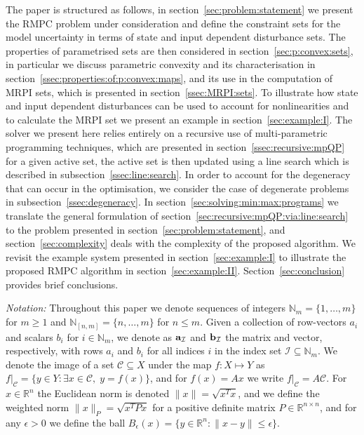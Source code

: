 \documentclass[journal]{IEEEtran}
\theoremstyle{remark}
\theoremstyle{definition}
\begin{document}
The paper is structured as follows, in section~\ref{sec:problem:statement} we present the RMPC problem under consideration
and define the constraint sets for the model uncertainty in terms of state and input dependent disturbance sets.
%
The properties of parametrised sets are then considered in section~\ref{sec:p:convex:sets}, in particular we discuss
parametric convexity and its characterisation in section~\ref{ssec:properties:of:p:convex:maps}, and its use in the computation of MRPI sets, which is presented in section~\ref{ssec:MRPI:sets}.
%
To illustrate how state and input dependent disturbances can be used to account for nonlinearities and 
to calculate the MRPI set we present an example in section~\ref{sec:example:I}.
%
The solver we present here relies entirely on a recursive use of multi-parametric programming techniques, 
which are presented in section~\ref{ssec:recursive:mpQP} for a given active set, the active set is then
updated using a line search which is described in subsection~\ref{ssec:line:search}. In order to account for the 
degeneracy that can occur in the optimisation, we consider the case of degenerate problems in subsection~\ref{ssec:degeneracy}.
%
In section~\ref{sec:solving:min:max:programs} we translate the general formulation of section~\ref{sec:recursive:mpQP:via:line:search}
to the problem presented in section~\ref{sec:problem:statement}, and section~\ref{sec:complexity}
deals with the complexity of the proposed algorithm.
%
We revisit the example system presented in section~\ref{sec:example:I} to illustrate the proposed RMPC
algorithm in section~\ref{sec:example:II}.
%
Section~\ref{sec:conclusion} provides brief conclusions.

\emph{Notation:} Throughout this paper 
%
we denote sequences of integers $\mathbb N_m = \{1,\ldots,m\}$ for $m\geq 1$ and $\mathbb N_{[n,m]} = \{n,\ldots,m\}$ for $n\leq m$.
%
Given a collection of row-vectors $a_i$ and scalars $b_i$ for $i\in\mathbb N_m$, we denote as ${\bf{a}}_{\mathcal I}$ and ${\bf{b}}_{\mathcal I}$ the matrix and vector, respectively, with rows $a_i$ and $b_i$ for all indices $i$ in the index set $\mathcal I\subseteq \mathbb N_m$.
%
We denote the image of a set $\mathcal C\subseteq X$ under the map $f:X\mapsto Y$ as $f\vert_{\mathcal C} = \{y\in Y:\exists x\in\mathcal C,\;y=f(x)\}$, and for $f(x) = Ax$ we write $f\vert_{\mathcal{C}} = A\mathcal{C}$.
%
For $x\in\mathbb R^n$ the Euclidean norm is denoted $\|x\|=\sqrt{x^T x}$, and we define the weighted norm $\|x\|_P=\sqrt{x^T P x}$ for a positive definite matrix $P\in\mathbb R^{n\times n}$, and for any $\epsilon > 0$ we define the ball $B_\epsilon(x) = \{y\in\mathbb R^n : \|x-y\| \leq \epsilon\}$.
\end{document}
